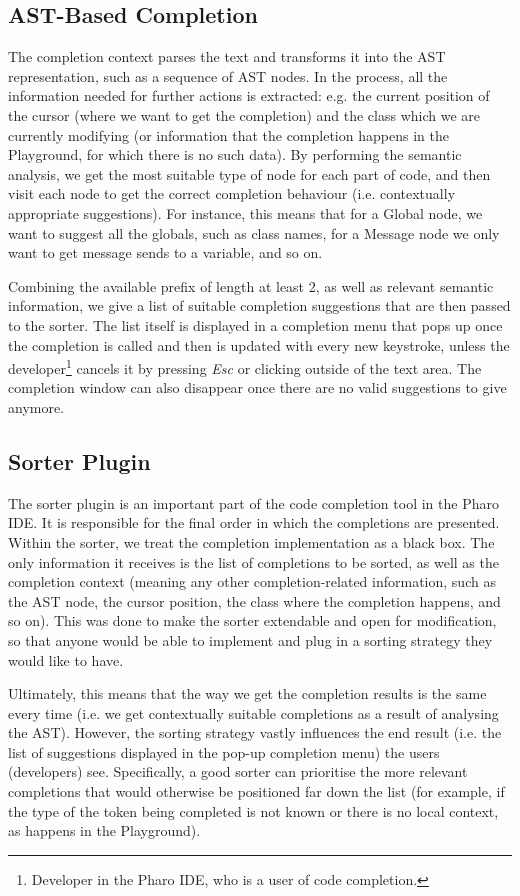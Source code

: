 \documentclass[sigplan,screen]{acmart}
\begin{document}
\subsection{AST-Based Completion}
The completion context parses the text and transforms it into the AST representation, such as a sequence of AST nodes. In the process, all the information needed for further actions is extracted: e.g. the current position of the cursor (where we want to get the completion) and the class which we are currently modifying (or information that the completion happens in the Playground, for which there is no such data). By performing the semantic analysis, we get the most suitable type of node for each part of code, and then visit each node to get the correct completion behaviour (i.e. contextually appropriate suggestions). For instance, this means that for a Global node, we want to suggest all the globals, such as class names, for a Message node we only want to get message sends to a variable, and so on.

Combining the available prefix of length at least 2, as well as relevant semantic information, we give a list of suitable completion suggestions that are then passed to the sorter. The list itself is displayed in a completion menu that pops up once the completion is called and then is updated with every new keystroke, unless the developer\footnote{Developer in the Pharo IDE, who is a user of code completion.} cancels it by pressing \textit{Esc} or clicking outside of the text area. The completion window can also disappear once there are no valid suggestions to give anymore.

\subsection{Sorter Plugin}
The sorter plugin is an important part of the code completion tool in the Pharo IDE. It is responsible for the final order in which the completions are presented. Within the sorter, we treat the completion implementation as a black box. The only information it receives is the list of completions to be sorted, as well as the completion context (meaning any other completion-related information, such as the AST node, the cursor position, the class where the completion happens, and so on). This was done to make the sorter extendable and open for modification, so that anyone would be able to implement and plug in a sorting strategy they would like to have.

Ultimately, this means that the way we get the completion results is the same every time (i.e. we get contextually suitable completions as a result of analysing the AST). However, the sorting strategy vastly influences the end result (i.e. the list of suggestions displayed in the pop-up completion menu) the users (developers) see. Specifically, a good sorter can prioritise the more relevant completions that would otherwise be positioned far down the list (for example, if the type of the token being completed is not known or there is no local context, as happens in the Playground).
\end{document}
